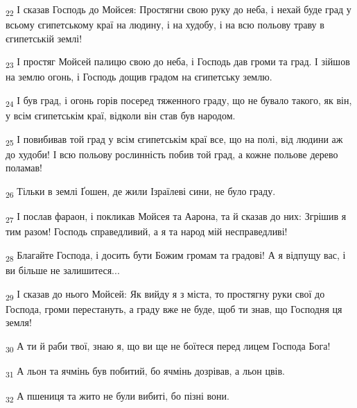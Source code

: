 \begin{tcolorbox}
\textsubscript{22} І сказав Господь до Мойсея: Простягни свою руку до неба, і нехай буде град у всьому єгипетському краї на людину, і на худобу, і на всю польову траву в єгипетській землі!
\end{tcolorbox}
\begin{tcolorbox}
\textsubscript{23} І простяг Мойсей палицю свою до неба, і Господь дав громи та град. І зійшов на землю огонь, і Господь дощив градом на єгипетську землю.
\end{tcolorbox}
\begin{tcolorbox}
\textsubscript{24} І був град, і огонь горів посеред тяженного граду, що не бувало такого, як він, у всім єгипетськім краї, відколи він став був народом.
\end{tcolorbox}
\begin{tcolorbox}
\textsubscript{25} І повибивав той град у всім єгипетськім краї все, що на полі, від людини аж до худоби! І всю польову рослинність побив той град, а кожне польове дерево поламав!
\end{tcolorbox}
\begin{tcolorbox}
\textsubscript{26} Тільки в землі Ґошен, де жили Ізраїлеві сини, не було граду.
\end{tcolorbox}
\begin{tcolorbox}
\textsubscript{27} І послав фараон, і покликав Мойсея та Аарона, та й сказав до них: Згрішив я тим разом! Господь справедливий, а я та народ мій несправедливі!
\end{tcolorbox}
\begin{tcolorbox}
\textsubscript{28} Благайте Господа, і досить бути Божим громам та градові! А я відпущу вас, і ви більше не залишитеся...
\end{tcolorbox}
\begin{tcolorbox}
\textsubscript{29} І сказав до нього Мойсей: Як вийду я з міста, то простягну руки свої до Господа, громи перестануть, а граду вже не буде, щоб ти знав, що Господня ця земля!
\end{tcolorbox}
\begin{tcolorbox}
\textsubscript{30} А ти й раби твої, знаю я, що ви ще не боїтеся перед лицем Господа Бога!
\end{tcolorbox}
\begin{tcolorbox}
\textsubscript{31} А льон та ячмінь був побитий, бо ячмінь дозрівав, а льон цвів.
\end{tcolorbox}
\begin{tcolorbox}
\textsubscript{32} А пшениця та жито не були вибиті, бо пізні вони.
\end{tcolorbox}
